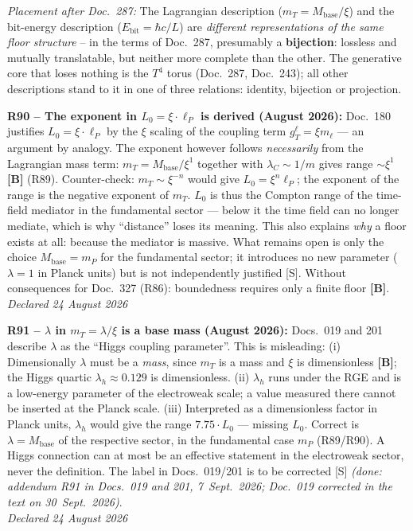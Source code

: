 \medskip

\noindent\textit{Placement after Doc.~287:} The Lagrangian description
($m_T = M_\mathrm{base}/\xi$) and the bit-energy description
($E_\mathrm{bit} = \hbar c/L$) are \emph{different representations of the same
floor structure} -- in the terms of Doc.~287, presumably a \textbf{bijection}:
lossless and mutually translatable, but neither more complete than the other.
The generative core that loses nothing is the $T^4$ torus (Doc.~287, Doc.~243);
all other descriptions stand to it in one of three relations:
identity, bijection or projection.

\medskip
\textbf{R90 -- The exponent in $L_0 = \xi\cdot\ell_P$ is derived (August 2026):}
Doc.~180 justifies $L_0 = \xi\cdot\ell_P$ by the $\xi$ scaling of the coupling term $g_T^\ell = \xi m_\ell$ --- an argument by analogy.
The exponent however follows \emph{necessarily} from the Lagrangian mass term: $m_T = M_\mathrm{base}/\xi^1$ together with $\lambda_C \sim 1/m$ gives range $\sim\xi^1$ \textbf{[B]} (R89).
Counter-check: $m_T \sim \xi^{-n}$ would give $L_0 = \xi^n\ell_P$; the exponent of the range is the negative exponent of $m_T$.
$L_0$ is thus the Compton range of the time-field mediator in the fundamental sector --- below it the time field can no longer mediate, which is why \enquote{distance} loses its meaning. This also explains \emph{why} a floor exists at all: because the mediator is massive.
What remains open is only the choice $M_\mathrm{base} = m_P$ for the fundamental sector; it introduces no new parameter ($\lambda = 1$ in Planck units) but is not independently justified [S].
Without consequences for Doc.~327 (R86): boundedness requires only a finite floor \textbf{[B]}.\\
\emph{Declared 24 August 2026}

\medskip
\textbf{R91 -- $\lambda$ in $m_T = \lambda/\xi$ is a base mass (August 2026):}
Docs.~019 and 201 describe $\lambda$ as the \enquote{Higgs coupling parameter}. This is misleading:
(i) Dimensionally $\lambda$ must be a \emph{mass}, since $m_T$ is a mass and $\xi$ is dimensionless \textbf{[B]}; the Higgs quartic $\lambda_h \approx 0.129$ is dimensionless.
(ii) $\lambda_h$ runs under the RGE and is a low-energy parameter of the electroweak scale; a value measured there cannot be inserted at the Planck scale.
(iii) Interpreted as a dimensionless factor in Planck units, $\lambda_h$ would give the range $7.75\cdot L_0$ --- missing $L_0$.
Correct is $\lambda = M_\mathrm{base}$ of the respective sector, in the fundamental case $m_P$ (R89/R90).
A Higgs connection can at most be an effective statement in the electroweak sector, never the definition. The label in Docs.~019/201 is to be corrected [S] \emph{(done: addendum R91 in Docs.~019 and 201, 7~Sept.~2026; Doc.~019 corrected in the text on 30~Sept.~2026)}.\\
\emph{Declared 24 August 2026}

